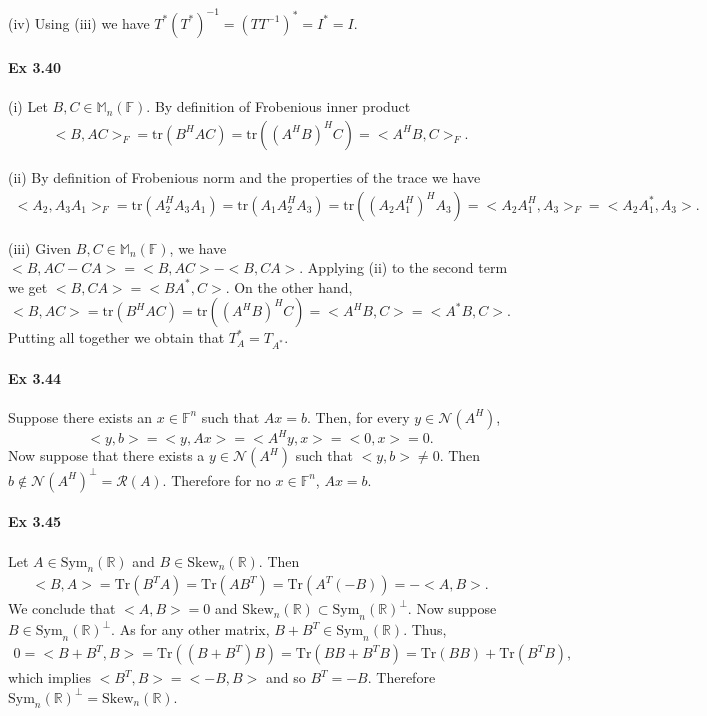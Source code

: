 \documentclass[letterpaper,12pt]{article}
\theoremstyle{definition}
\begin{document}
\begin{spacing}{1.3}{}
	(iv)
	Using (iii) we have $T^*(T^*)^{-1}=(TT^{-1})^*=I^*=I$. \\\\
	
	\textbf{Ex 3.40} \\\\
	(i)
	Let $B,C\in\mathbb M_n(\mathbb F)$.
	By definition of Frobenious inner product
	\begin{align*}
	<B,AC>_F=\text{tr}(B^HAC)=\text{tr}((A^HB)^HC)=<A^HB,C>_F.
	\end{align*}
	
	(ii)
	By definition of Frobenious norm and the properties of the trace we have
	\begin{align*}
	<A_2,A_3A_1>_F=\text{tr}(A_2^HA_3A_1)=
	\text{tr}(A_1A_2^HA_3)=\text{tr}((A_2A_1^H)^HA_3)=
	<A_2A_1^H,A_3>_F=<A_2A_1^*,A_3>.
	\end{align*}
	
	(iii)
	Given $B,C\in\mathbb M_n(\mathbb F)$, we have $<B,AC-CA>=<B,AC>-<B,CA>$.
	Applying (ii) to the second term we get $<B,CA>=<BA^*,C>$.
	On the other hand,
	\begin{equation*}
	<B,AC>=\text{tr}(B^HAC)=\text{tr}((A^HB)^HC)=<A^HB,C>=<A^*B,C>.
	\end{equation*}
	Putting all together we obtain that $T_A^*=T_{A^*}$. \\\\
	
	\textbf{Ex 3.44} \\\\
	Suppose there exists an $x\in\mathbb F^n$ such that $Ax=b$.
	Then, for every $y\in\mathcal N(A^H)$,
	$$<y,b>=<y,Ax>=<A^Hy,x>=<0,x>=0.$$
	Now suppose that there exists a $y\in\mathcal N(A^H)$ such that $<y,b>\neq0$.
	Then $b\notin\mathcal N(A^H)^\perp=\mathcal R(A)$.
	Therefore for no $x\in\mathbb F^n$, $Ax=b$. \\\\
	
	\textbf{Ex 3.45} \\\\
	Let $A\in\text{Sym}_n(\mathbb R)$ and $B\in\text{Skew}_n(\mathbb R)$.
	Then
	\begin{align*}
	<B,A>=\text{Tr}(B^TA)=\text{Tr}(AB^T)=
	\text{Tr}(A^T(-B))=-<A,B>.
	\end{align*}
	We conclude that $<A,B>=0$ and $\text{Skew}_n(\mathbb R)\subset\text{Sym}_n(\mathbb R)^\perp$.
	Now suppose $B\in\text{Sym}_n(\mathbb R)^\perp$.
	As for any other matrix, $B+B^T\in\text{Sym}_n(\mathbb R)$.
	Thus,
	\begin{align*}
	0 = <B+B^T,B>=\text{Tr}((B+B^T)B) =\text{Tr}(BB + B^TB)=
	\text{Tr}(BB)+\text{Tr}(B^TB),
	\end{align*}
	which implies $<B^T,B>=<-B,B>$ and so $B^T=-B$.
	Therefore $\text{Sym}_n(\mathbb R)^\perp=\text{Skew}_n(\mathbb R)$. \\\\
	

\end{spacing}
\end{document}
